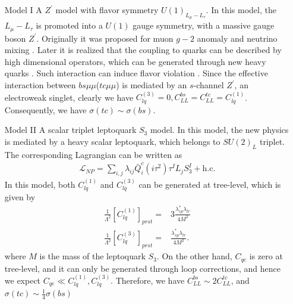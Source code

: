 \documentclass[a4paper,11pt]{article}
\begin{document}
\begin{enumerate}
    \item[Model I]   A $Z^{\prime}$ model with flavor symmetry $U(1)_{L_{\mu}-L_{\tau}}$.
        In this model, the $L_{\mu}-L_{\tau}$ is promoted into a $U(1)$ gauge symmetry,
      with a massive gauge boson $Z^{\prime}$.
    Originally it was proposed for muon $g-2$ anomaly \cite{Baek:2001kca} and neutrino mixing \cite{Ma:2001md}.
    Later it is realized that the coupling to quarks can be described by high dimensional operators, which can be generated through new heavy quarks \cite{Fox:2011qd}.
    Such interaction can induce flavor violation \cite{Altmannshofer:2014cfa}.
    Since the effective interaction between $bs\mu\mu$($tc\mu\mu$) is mediated by an $s$-channel $Z^{\prime}$, an electroweak singlet,
    clearly we have $C_{lq}^{(3)}=0,C_{LL}^{bs}=C_{LL}^{tc}=C_{lq}^{(1)}$.
    Consequently, we have $\sigma(tc)\sim\sigma(bs)$.

    \item[Model II] A scalar triplet leptoquark $S_3$ model.
        In this model, the new physics is mediated by a heavy scalar leptoquark, which belongs to $SU(2)_L$ triplet.
        The corresponding Lagrangian can be written as \cite{Dorsner:2016wpm}
        \begin{align}
            \mathcal{L}_{NP}=\sum_{i,j}\lambda_{ij}\bar{Q}_i^c(i\tau^2)\tau^{I}L_jS_3^{I}+\textrm{h.c.}
        \end{align}
        In this model, both $C_{lq}^{(1)}$ and $C_{lq}^{(3)}$ can be generated at tree-level, which is given by \cite{Gherardi:2020det}
        \begin{align}
            \frac{1}{\Lambda^2}[C_{lq}^{(1)}]_{prst}=&3\frac{\lambda_{sp}^{*}\lambda_{tr}}{4M^2}\\
            \frac{1}{\Lambda^2}[C_{lq}^{(3)}]_{prst}=&\frac{\lambda_{sp}^{*}\lambda_{tr}}{4M^2}.
        \end{align}
        where $M$ is the mass of the leptoquark $S_3$.
        On the other hand, $C_{qe}$ is zero at tree-level, and it can only be generated through loop corrections, and hence we expect $C_{qe}\ll C_{lq}^{(1)},C_{lq}^{(3)}$.
        Therefore, we have $C_{LL}^{bs}\sim2C_{LL}^{tc}$,
        and $\sigma(tc)\sim\frac{1}{4}\sigma(bs)$


\end{enumerate}
\end{document}
